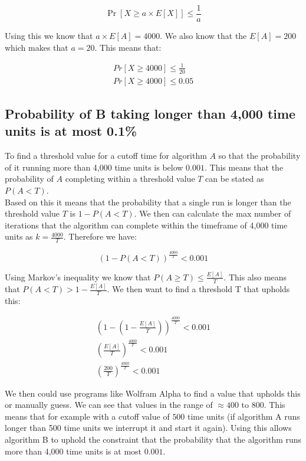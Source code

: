 \documentclass{article}
\begin{document}
\[\Pr[X \geq a \times E[X]] \leq \frac{1}{a}\]

\noindent Using this we know that \(a \times E[A] = 4000\). We also know that the \(E[A] = 200\) which makes that \(a = 20\). This means that:



\begin{align*}
Pr[X \geq 4000] \leq \frac{1}{20} \\
Pr[X \geq 4000] \leq 0.05
\end{align*}

\subsection{Probability of B taking longer than 4,000 time units is at most 0.1\%}
To find a threshold value for a cutoff time for algorithm \(A\) so that the probability of it running more than 4,000 time units is below \(0.001\). This means that the probability of \(A\) completing within a threshold value \(T\) can be stated as \(P(A < T)\). \\

\noindent Based on this it means that the probability that a single run is longer than the threshold value \(T\) is \(1-P(A < T)\). We then can calculate the max number of iterations that the algorithm can complete within the timeframe of 4,000 time units as \(k = \frac{4000}{T}\). Therefore we have:

\[(1-P(A < T))^\frac{4000}{T} < 0.001\]

\noindent Using Markov's inequality we know that \(P(A \geq T) \leq \frac{E[A]}{T}\). This also means that \(P(A < T) > 1 - \frac{E[A]}{T}\). We then want to find a threshold T that upholds this:

\begin{align*}
\left(1- \left(1 - \frac{E[A]}{T}\right)\right)^{\frac{4000}{T}} < 0.001 \\
\left(\frac{E[A]}{T}\right)^{\frac{4000}{T}} < 0.001 \\
\left(\frac{200}{T}\right)^{\frac{4000}{T}} < 0.001 
\end{align*}

\noindent We then could use programs like Wolfram Alpha to find a value that upholds this or manually guess. We can see that values in the range of \(\approx 400 \text{ to } 800\). This means that for example with a cutoff value of \(500\) time units (if algorithm A runs longer than 500 time units we interrupt it and start it again). Using this allows algorithm B to uphold the constraint that the probability that the algorithm runs more than 4,000 time units is at most \(0.001\).

\newpage


\end{document}
